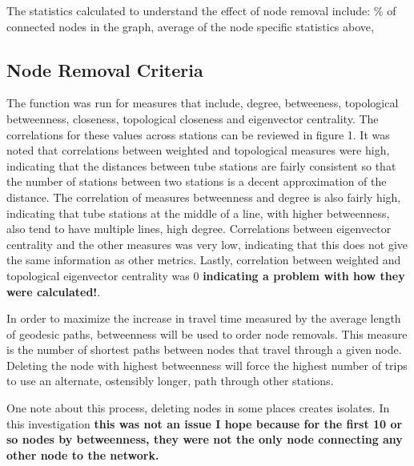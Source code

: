 \documentclass[11pt]{article} %
\begin{document}
The statistics calculated to understand the effect of node removal include: \% of connected nodes in the graph, average of the node specific statistics above, 

\subsection{Node Removal Criteria}

The function was run for measures that include, degree, betweeness, topological betweenness, closeness, topological closeness and eigenvector centrality. The correlations for these values across stations can be reviewed in figure 1. It was noted that correlations between weighted and topological measures were high, indicating that the distances between tube stations are fairly consistent so that the number of stations between two stations is a decent approximation of the distance. The correlation of measures betweenness and degree is also fairly high, indicating that tube stations at the middle of a line, with higher betweenness, also tend to have multiple lines, high degree. Correlations between eigenvector centrality and the other measures was very low, indicating that this does not give the same information as other metrics. Lastly, correlation between weighted and topological eigenvector centrality was 0 \textbf{indicating a problem with how they were calculated!}. 

In order to maximize the increase in travel time measured by the average length of geodesic paths, betweenness will be used to order node removals. This measure is the number of shortest paths between nodes that travel through a given node. Deleting the node with highest betweenness will force the highest number of trips to use an alternate, ostensibly longer, path through other stations. 

One note about this process, deleting nodes in some places creates isolates. In this investigation \textbf{this was not an issue I hope because for the first 10 or so nodes by betweenness, they were not the only node connecting any other node to the network.}
\end{document}
